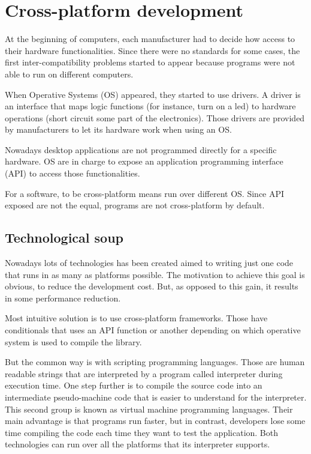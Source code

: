 \chapter{Cross-platform development}

At the beginning of computers, each manufacturer had to decide how access to
their hardware functionalities. Since there were no standards for some cases,
the first inter-compatibility problems started to appear because programs were
not able to run on different computers.

When Operative Systems (OS) appeared, they started to use drivers. A driver is
an interface that maps logic functions (for instance, turn on a led) to hardware
operations (short circuit some part of the electronics). Those drivers are
provided by manufacturers to let its hardware work when using an OS.

Nowadays desktop applications are not programmed directly for a specific 
hardware. OS are in charge to expose an application programming interface (API)
to access those functionalities.

For a software, to be cross-platform means run over different OS. Since API
exposed are not the equal, programs are not cross-platform by default.

\section{Technological soup}

Nowadays lots of technologies has been created aimed to writing just one code
that runs in as many as platforms possible. The motivation to achieve this goal
is obvious, to reduce the development cost. But, as opposed to this gain, it
results in some performance reduction.

Most intuitive solution is to use cross-platform frameworks. Those have
conditionals that uses an API function or another depending on which operative
system is used to compile the library.

But the common way is with scripting programming languages. Those are human
readable strings that are interpreted by a program called interpreter during
execution time. One step further is to compile the source code into an
intermediate pseudo-machine code that is easier to understand for the
interpreter. This second group is known as virtual machine programming
languages. Their main advantage is that programs run faster, but in contrast,
developers lose some time compiling the code each time they want to test the
application. Both technologies can run over all the platforms that its
interpreter supports.


